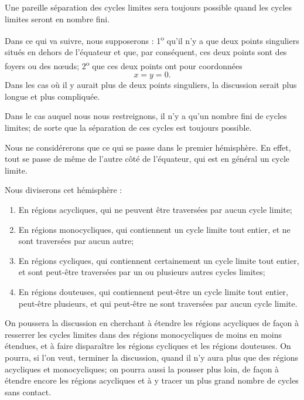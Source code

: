 \documentclass[11pt]{article}
\begin{document}
Une pareille séparation des cycles limites sera toujours possible quand les cycles limites seront en nombre fini.

Dans ce qui va suivre, nous supposerons : 1\textsuperscript{o} qu’il n’y a que deux points singuliers situés en dehors de l’équateur et que, par conséquent, ces deux points sont des foyers ou des nœuds; 2\textsuperscript{o} que ces deux points ont pour coordonnées
\[
x=y=0.
\]
Dans les cas où il y aurait plus de deux points singuliers, la discussion serait plus longue et plus compliquée.

Dans le cas auquel nous nous restreignons, il n’y a qu’un nombre fini de cycles limites; de sorte que la séparation de ces cycles est toujours possible.

Nous ne considérerons que ce qui se passe dans le premier hémisphère. En effet, tout se passe de même de l’autre côté de l’équateur, qui est en général un cycle limite.

Nous diviserons cet hémisphère :
\begin{enumerate}[label=\arabic*\textsuperscript{o}, leftmargin=3em]
\item En régions acycliques, qui ne peuvent être traversées par aucun cycle limite;
\item En régions monocycliques, qui contiennent un cycle limite tout entier, et ne sont traversées par aucun autre;
\item En régions cycliques, qui contiennent certainement un cycle limite tout entier, et sont peut-être traversées par un ou plusieurs autres cycles limites;
\item En régions douteuses, qui contiennent peut-être un cycle limite tout entier, peut-être plusieurs, et qui peut-être ne sont traversées par aucun cycle limite.
\end{enumerate}

On poussera la discussion en cherchant à étendre les régions acycliques de façon à resserrer les cycles limites dans des régions monocycliques de moins en moins étendues, et à faire disparaître les régions cycliques et les régions douteuses. On pourra, si l’on veut, terminer la discussion, quand il n’y aura plus que des régions acycliques et monocycliques; on pourra aussi la pousser plus loin, de façon à étendre encore les régions acycliques et à y tracer un plus grand nombre de cycles sans contact.
\end{document}

